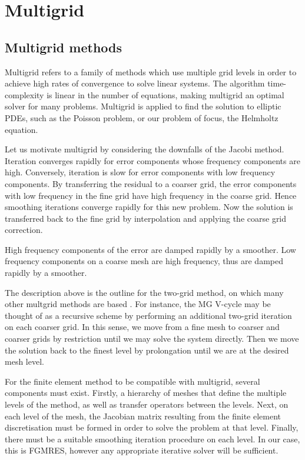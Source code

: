 \chapter{Multigrid}


\section{Multigrid methods}

Multigrid refers to a family of methods which use multiple grid levels in order to achieve high rates of convergence to solve linear systems.
The algorithm time-complexity is linear in the number of equations, making multigrid an optimal solver for many problems.
Multigrid is applied to find the solution to elliptic PDEs, such as the Poisson problem, or our problem of focus, the Helmholtz equation.

Let us motivate multigrid by considering the downfalls of the Jacobi method.
Iteration converges rapidly for error components whose frequency components are high.
Conversely, iteration is slow for error components with low frequency components.
By transferring the residual to a coarser grid, the error components with low frequency in the fine grid have high frequency in the coarse grid.
Hence smoothing iterations converge rapidly for this new problem.
Now the solution is transferred back to the fine grid by interpolation and applying the coarse grid correction.

High frequency components of the error are damped rapidly by a smoother.
Low frequency components on a coarse mesh are high frequency, thus are damped rapidly by a smoother.

The description above is the outline for the two-grid method, on which many other multgrid methods are based \cite{hackbusch}.
For instance, the MG V-cycle may be thought of as a recursive scheme by performing an additional two-grid iteration on each coarser grid.
In this sense, we move from a fine mesh to coarser and coarser grids by restriction until we may solve the system directly.
Then we move the solution back to the finest level by prolongation until we are at the desired mesh level. 

For the finite element method to be compatible with multigrid, several components must exist.
Firstly, a hierarchy of meshes that define the multiple levels of the method, as well as transfer operators between the levels.
Next, on each level of the mesh, the Jacobian matrix resulting from the finite element discretisation must be formed in order to solve the problem at that level.
Finally, there must be  a suitable smoothing iteration procedure on each level.
In our case, this is FGMRES, however any appropriate iterative solver will be sufficient.




